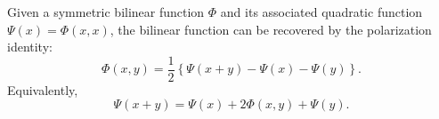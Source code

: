 Given a symmetric bilinear function $\Phi$ and its associated quadratic function $\Psi(x) = \Phi(x, x)$, the bilinear function can be recovered by the polarization identity:
$$\Phi(x, y) = \frac{1}{2} \left\{ \Psi(x + y) - \Psi(x) - \Psi(y) \right\}.$$
Equivalently,
$$\Psi(x + y) = \Psi(x) + 2\Phi(x, y) + \Psi(y).$$
